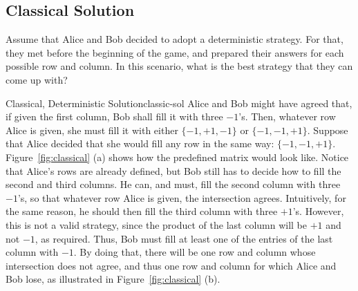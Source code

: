 \documentclass{llncs}
\begin{document}
\subsection{Classical Solution}
\label{sec:classic-sol}
Assume that Alice and Bob decided to adopt a deterministic strategy.
For that, they met before the beginning of the game, and prepared
their answers for each possible row and column. In this scenario,
what is the best strategy that they can come up with?

\begin{tcbexample}{Classical, Deterministic Solution}{classic-sol}
  Alice and Bob might have agreed that, if given the first column, Bob shall fill it
  with three \(-1\)'s. Then, whatever row Alice is given, she must fill
  it with either \(\{-1, +1, -1\}\) or \(\{-1, -1, +1\}\). Suppose that
  Alice decided that she would fill any row in the same way:
  \(\{-1, -1, +1\}\). Figure~\ref{fig:classical} (a) shows how the
  predefined matrix would look like. Notice that Alice's rows are
  already defined, but Bob still has to decide how to fill the second
  and third columns. He can, and must, fill the second column with three
  \(-1\)'s, so that whatever row Alice is given, the intersection
  agrees. Intuitively, for the same reason, he should then fill the
  third column with three \(+1\)'s. However, this is not a valid
  strategy, since the product of the last column will be \(+1\) and not
  \(-1\), as required. Thus, Bob must fill at least one of the
  entries of the last column with \(-1\).  By doing that, there will be
  one row and column whose intersection does not agree, and thus one row
  and column for which Alice and Bob lose, as illustrated in
  Figure~\ref{fig:classical} (b).


\end{tcbexample}
\end{document}
